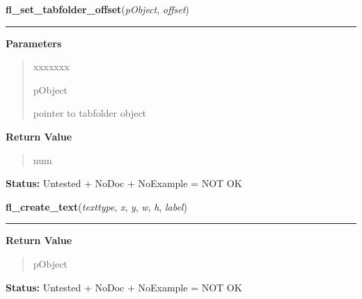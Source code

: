 \hspace{.8\funcindent}\begin{boxedminipage}{\funcwidth}

    \raggedright \textbf{fl\_set\_tabfolder\_offset}(\textit{pObject}, \textit{offset})

    \vspace{-1.5ex}

    \rule{\textwidth}{0.5\fboxrule}
\setlength{\parskip}{2ex}
\setlength{\parskip}{1ex}
      \textbf{Parameters}
      \vspace{-1ex}

      \begin{quote}
        \begin{Ventry}{xxxxxxx}

          \item[pObject]

          pointer to tabfolder object

        \end{Ventry}

      \end{quote}

      \textbf{Return Value}
    \vspace{-1ex}

      \begin{quote}
      num

      \end{quote}

\textbf{Status:} Untested + NoDoc + NoExample = NOT OK



    \end{boxedminipage}

    \label{xformslib:library:fl_create_text}

    \vspace{0.5ex}

\hspace{.8\funcindent}\begin{boxedminipage}{\funcwidth}

    \raggedright \textbf{fl\_create\_text}(\textit{texttype}, \textit{x}, \textit{y}, \textit{w}, \textit{h}, \textit{label})

    \vspace{-1.5ex}

    \rule{\textwidth}{0.5\fboxrule}
\setlength{\parskip}{2ex}
\setlength{\parskip}{1ex}
      \textbf{Return Value}
    \vspace{-1ex}

      \begin{quote}
      pObject

      \end{quote}

\textbf{Status:} Untested + NoDoc + NoExample = NOT OK



    \end{boxedminipage}

